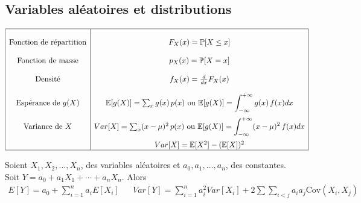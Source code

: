 \documentclass[12pt,french]{article}
\begin{document}

\subsection*{Variables aléatoires et distributions}

\vspace{0.1in}

\begin{displaymath}
\begin{array}{|c|c|}
\hline 
& \\
\mbox{Fonction de répartition} & F_X(x)= \mathbb{P}[X \le x]\\[12pt]
\mbox{Fonction de masse} & p_X(x) = \mathbb{P}[X=x]\\[12pt]
\mbox{Densité} & f_X(x) = \frac{d}{dx}F_X(x) \\[12pt]
\mbox{Espérance de $g(X)$} & {\mathbb E}[g(X)]=\sum_{
x} g(x)\,p(x) \mbox{    ou    } \displaystyle {\mathbb
E}[g(X)]=\int_{-\infty}^{+\infty}g(x)\,f(x)dx \\[12pt]
\mbox{Variance de $X$} & {Var}[X]=\sum_{
x} (x-\mu)^2\,p(x) \mbox{    ou    } \displaystyle {\mathbb
E}[g(X)]=\int_{-\infty}^{+\infty}(x-\mu)^2\,f(x)dx \\[12pt]
& Var[X]=\mathbb{E}[X^2]-(\mathbb{E}[X])^2\\
\hline
\end{array}
\end{displaymath}

\vspace{0.5cm}

 Soient $X_1,X_2,\ldots,X_n$, des variables aléatoires et $a_0,a_1,\ldots,a_n$, des constantes.\\
 Soit $Y=a_0+a_1X_1+\cdots+a_nX_n$. Alors 
 \vspace{-0.3cm}
 {\small
\begin{align*}
E[Y]=a_0+\sum_{i=1}^na_iE[X_i] & &
Var[Y] =\sum_{i=1}^na_i^2Var[X_i]+2\sum\sum\limits_{i<j}a_ia_j \mbox{Cov}(X_i,X_j)
\end{align*}
}

\newpage



\vspace*{-2cm}
\end{document}
